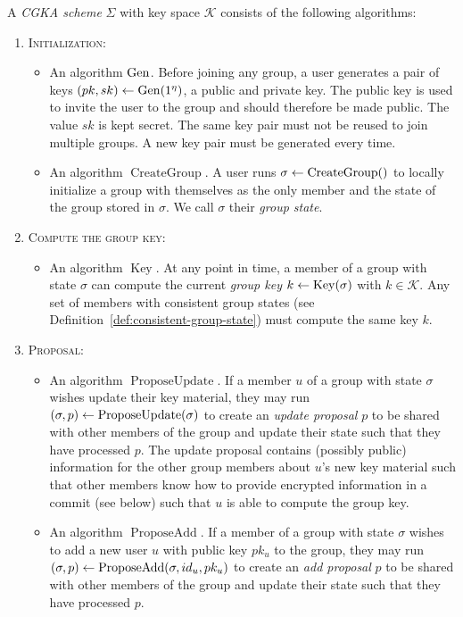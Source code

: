 \begin{definition}[CGKA]
	A \emph{CGKA scheme} $\Sigma$ with key space $\mathcal{K}$ consists of the following algorithms:
	\begin{enumerate}[1.]
		\item[] \textsc{Initialization:}
			\begin{itemize}
				\item An algorithm $\mathrm{Gen}$. Before joining any group, a user generates a pair of keys $(pk, sk) \leftarrow \mathrm{Gen}(1^\eta)$, a public and private key. The public key is used to invite the user to the group and should therefore be made public. The value $sk$ is kept secret. The same key pair must not be reused to join multiple groups. A new key pair must be generated every time.
				\item An algorithm $\operatorname{CreateGroup}$. A user runs $\sigma \leftarrow \operatorname{CreateGroup}()$ to locally initialize a group with themselves as the only member and the state of the group stored in $\sigma$. We call $\sigma$ their \emph{group state}.
			\end{itemize}
		\item[] \textsc{Compute the group key:}
			\begin{itemize}
				\item An algorithm $\operatorname{Key}$. At any point in time, a member of a group with state $\sigma$ can compute the current \emph{group key} $k \leftarrow \operatorname{Key}(\sigma)$ with $k \in \mathcal{K}$. Any set of members with consistent group states (see Definition~\vref{def:consistent-group-state}) must compute the same key $k$.
			\end{itemize}
		\item[] \textsc{Proposal:}
			\begin{itemize}
				\item An algorithm $\operatorname{ProposeUpdate}$. If a member $u$ of a group with state $\sigma$ wishes update their key material, they may run $(\sigma, p) \leftarrow \operatorname{ProposeUpdate}(\sigma)$ to create an \emph{update proposal} $p$ to be shared with other members of the group and update their state such that they have processed $p$. The update proposal contains (possibly public) information for the other group members about $u$'s new key material such that other members know how to provide encrypted information in a commit (see below) such that $u$ is able to compute the group key.
				\item An algorithm $\operatorname{ProposeAdd}$. If a member of a group with state $\sigma$ wishes to add a new user $u$ with public key $pk_u$ to the group, they may run $(\sigma, p) \leftarrow \operatorname{ProposeAdd}(\sigma, id_u, pk_u)$ to create an \emph{add proposal} $p$ to be shared with other members of the group and update their state such that they have processed $p$.

\end{itemize}
\end{enumerate}
\end{definition}
